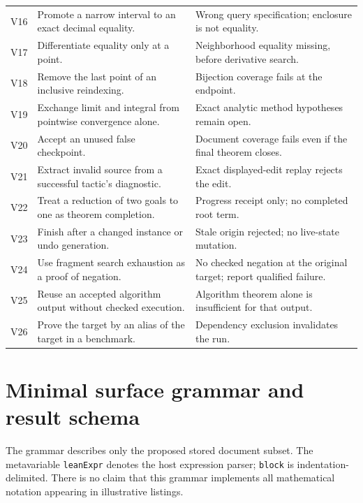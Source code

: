 \documentclass[11pt,a4paper]{article}
\newcommand{\code}[1]{\nolinkurl{#1}}
\theoremstyle{definition}
\begin{document}
\begin{longtable}{@{}P{.07\textwidth}P{.44\textwidth}P{.40\textwidth}@{}}
V16 & Promote a narrow interval to an exact decimal equality. & Wrong query specification; enclosure is not equality.\\
V17 & Differentiate equality only at a point. & Neighborhood equality missing, before derivative search.\\
V18 & Remove the last point of an inclusive reindexing. & Bijection coverage fails at the endpoint.\\
V19 & Exchange limit and integral from pointwise convergence alone. & Exact analytic method hypotheses remain open.\\
V20 & Accept an unused false checkpoint. & Document coverage fails even if the final theorem closes.\\
V21 & Extract invalid source from a successful tactic's diagnostic. & Exact displayed-edit replay rejects the edit.\\
V22 & Treat a reduction of two goals to one as theorem completion. & Progress receipt only; no completed root term.\\
V23 & Finish after a changed instance or undo generation. & Stale origin rejected; no live-state mutation.\\
V24 & Use fragment search exhaustion as a proof of negation. & No checked negation at the original target; report qualified failure.\\
V25 & Reuse an accepted algorithm output without checked execution. & Algorithm theorem alone is insufficient for that output.\\
V26 & Prove the target by an alias of the target in a benchmark. & Dependency exclusion invalidates the run.\\
\bottomrule
\end{longtable}
\normalsize

\section{Minimal surface grammar and result schema}\label{app:grammar}
The grammar describes only the proposed stored document subset. The metavariable
\code{leanExpr} denotes the host expression parser; \code{block} is indentation-
delimited. There is no claim that this grammar implements all mathematical
notation appearing in illustrative listings.
\end{document}
